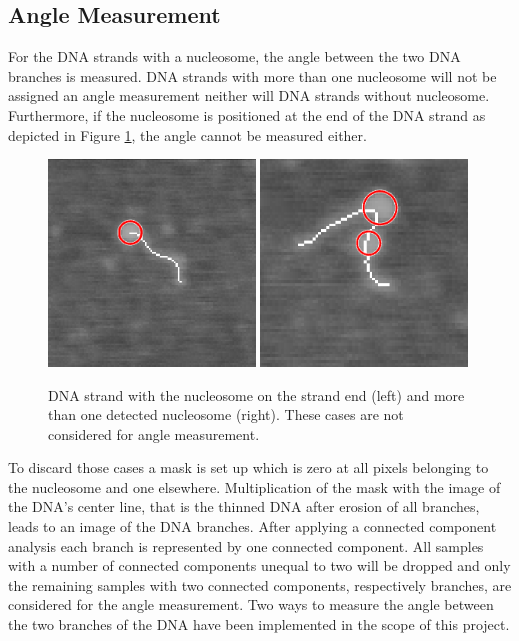\documentclass{article}
\begin{document}
\subsection{Angle Measurement}\label{sec:Angle Measurement}
For the DNA strands with a nucleosome, the angle between the two DNA branches is measured. DNA strands with more than one nucleosome will not be assigned an angle measurement neither will DNA strands without nucleosome. Furthermore, if the nucleosome is positioned at the end of the DNA strand as depicted in Figure \ref{fig: angle not}, the angle cannot be measured either. 
\begin{figure}[htb]
\includegraphics[width = 0.49\textwidth]{angle_endstrand.png}
\includegraphics[width = 0.49\textwidth]{angle_two.png}
\caption{DNA strand with the nucleosome on the strand end (left) and more than one detected nucleosome (right). These cases are not considered for angle measurement.}\label{fig: angle not}
\end{figure}

To discard those cases a mask is set up which is zero at all pixels belonging to the nucleosome and one elsewhere. Multiplication of the mask with the image of the DNA's center line, that is the thinned DNA after erosion of all branches, leads to an image of the DNA branches. After applying a connected component analysis each branch is represented by one connected component. All samples with a number of connected components unequal to two will be dropped and only the remaining samples with two connected components, respectively branches, are considered for the angle measurement.
Two ways to measure the angle between the two branches of the DNA have been implemented in the scope of this project.
\end{document}
